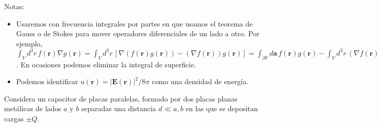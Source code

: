 \documentclass{exam}
\begin{document}
\begin{questions}
  Notas:
  \begin{itemize}
  \item Usaremos con frecuencia integrales por partes en que usamos el
    teorema de Gauss o de Stokes para mover operadores diferenciales
    de un lado a otro. Por ejemplo, $\int_Vd^3r\, f(\bm r)\nabla g(\bm
    r)=\int_Vd^3r\, [\nabla(f(\bm r) g(\bm r))-(\nabla f(\bm r))g(\bm
    r)]=\int_{\partial V} d\bm a\, f(\bm r) g(\bm r)-\int_Vd^3r\,
    (\nabla f(\bm r))g(\bm r)$. En ocasiones podemos eliminar la
    integral de superficie.
  \item Podemos identificar $u(\bm r)=|\bm E(\bm r)|^2/8\pi$ como una
    densidad de energía.
  \end{itemize}
  \question Considera un capacitor de placas paralelas, formado por
  dos placas planas metálicas de lados $a$ y $b$ separadas una
  distancia $d\ll a,b$ en las que se depositan cargas $\pm Q$.
\end{questions}
\end{document}
